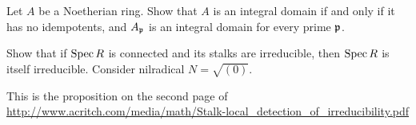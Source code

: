 \begin{problem}
	\gim
	Let $A$ be a Noetherian ring.
	Show that $A$ is an integral domain if and only if it has no idempotents,
	and $A_\mathfrak p$ is an integral domain for every prime $\mathfrak p$.
	\begin{hint}
		Show that if $\operatorname{Spec} R$ is connected and its stalks are irreducible,
		then $\operatorname{Spec} R$ is itself irreducible.
		Consider nilradical $N = \sqrt{(0)}$.
	\end{hint}
	\begin{sol}
		This is the proposition on the second page of
		\url{http://www.acritch.com/media/math/Stalk-local_detection_of_irreducibility.pdf}
	\end{sol}
\end{problem}

